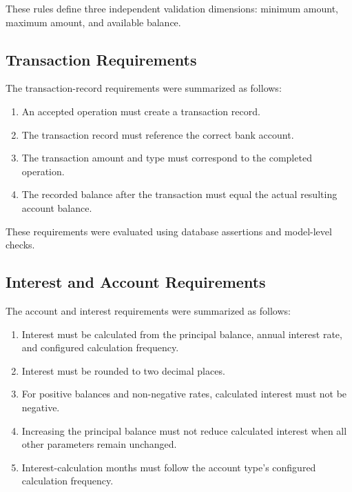 \documentclass[12pt]{article}
\begin{document}
These rules define three independent validation dimensions: minimum amount,
maximum amount, and available balance.

\subsection{Transaction Requirements}

The transaction-record requirements were summarized as follows:

\begin{enumerate}[label=\textbf{T\arabic*:}]
    \item An accepted operation must create a transaction record.
    \item The transaction record must reference the correct bank account.
    \item The transaction amount and type must correspond to the completed
          operation.
    \item The recorded balance after the transaction must equal the actual
          resulting account balance.
\end{enumerate}

These requirements were evaluated using database assertions and model-level
checks.

\subsection{Interest and Account Requirements}

The account and interest requirements were summarized as follows:

\begin{enumerate}[label=\textbf{I\arabic*:}]
    \item Interest must be calculated from the principal balance, annual
          interest rate, and configured calculation frequency.
    \item Interest must be rounded to two decimal places.
    \item For positive balances and non-negative rates, calculated interest
          must not be negative.
    \item Increasing the principal balance must not reduce calculated interest
          when all other parameters remain unchanged.
    \item Interest-calculation months must follow the account type's configured
          calculation frequency.
\end{enumerate}
\end{document}
